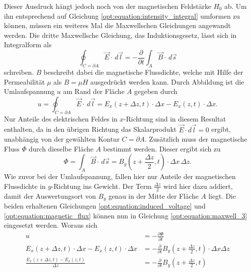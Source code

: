 Dieser Ausdruck hängt jedoch noch von der magnetischen Feldstärke $H_0$ ab.
Um ihn entsprechend auf Gleichung \eqref{opt:equation:intensity_integral} umformen zu können, müssen ein weiteres Mal die Maxwellschen Gleichungen angewandt werden.
Die dritte Maxwellsche Gleichung, das Induktionsgesetz, lässt sich in Integralform als
\begin{equation}
\oint_{C=\partial A} \vec{E} \cdot\, d\vec{l}
=
-\frac{\partial}{\partial t} \int_{A} \vec{B} \cdot\, d\vec{s}
\label{opt:equation:maxwell_3}
\end{equation}
schreiben.
$B$ beschreibt dabei die magnetische Flussdichte, welche mit Hilfe der Permeabilität $\mu$ als $B = \mu H$ ausgedrückt werden kann.
Durch Abbildung  ist die Umlaufspannung $u$ am Rand der Fläche $A$ gegeben durch
\begin{equation}
u
=
\oint_{C=\partial A} \vec{E} \cdot\, d\vec{l}
=
E_x(z+\Delta z,t) \cdot \Delta x - E_x(z,t) \cdot \Delta x
.
\label{opt:equation:induced_voltage}
\end{equation}
Nur Anteile des elektrischen Feldes in $x$-Richtung sind in diesem Resultat enthalten, da in den übrigen Richtung das Skalarprodukt $\vec{E} \cdot d\vec{l} = 0$ ergibt, unabhängig von der gewählten Kontur $C = \partial A$.
Zusätzlich muss der magnetische Fluss $\Phi$ durch dieselbe Fläche $A$ bestimmt werden.
Dieser ergibt sich zu
\begin{equation}
\Phi
=
\int_{A} \vec{B} \cdot\, d\vec{s}
=
B_y\left(z+\frac{\Delta z}{2},t\right) \cdot \Delta x \,\Delta z
.
\label{opt:equation:magnetic_flux}
\end{equation}
Wie zuvor bei der Umlaufspannung, fallen hier nur Anteile der magnetischen Flussdichte in $y$-Richtung ins Gewicht.
Der Term $\frac{\Delta z}{2}$ wird hier dazu addiert, damit der Auswertungsort von $B_y$ genau in der Mitte der Fläche $A$ liegt.
Die beiden erhaltenen Gleichungen \eqref{opt:equation:induced_voltage} und \eqref{opt:equation:magnetic_flux} können nun in Gleichung \eqref{opt:equation:maxwell_3} eingesetzt werden.
Woraus sich
\begin{align*}
u
&=
-\frac{\partial\Phi}{\partial t}
\\
E_x(z+\Delta z,t) \cdot \Delta x - E_x(z,t) \cdot \Delta x
&=
-\frac{\partial}{\partial t} B_y\left(z+\frac{\Delta z}{2},t\right) \cdot \Delta x \Delta z
\\
\frac{E_x(z+\Delta z,t) - E_x(z,t)}{\Delta z}
&=
-\frac{\partial}{\partial t} B_y\left(z+\frac{\Delta z}{2},t\right)
\end{align*}
